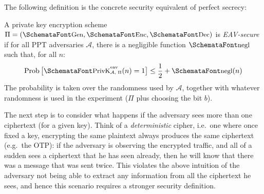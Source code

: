   The following definition is the concrete security equivalent of perfect secrecy:
  \begin{definition}
    \label{def:eav_secure}
    A private key encryption scheme $\Pi = (\myemph{Gen}, \myemph{Enc}, \myemph{Dec})$ is \emph{EAV-secure} if for all PPT adversaries $\mathcal{A}$, there is a negligible function $\myemph{negl}$ such that, for all $n$:
    \begin{equation}
      \textup{Prob}\left[\privkeav (n) = 1\right] \le \frac{1}{2} + \myemph{negl}(n)
    \end{equation}
    The probability is taken over the randomness used by $\mathcal{A}$, together with whatever randomness is used in the experiment ($\Pi$ plus choosing the bit $b$).
  \end{definition}

  \noindent The next step is to consider what happens if the adversary sees more than one ciphertext (for a given key). Think of a \emph{deterministic} cipher, i.e.\ one where once fixed a key, encrypting the same plaintext always produces the same ciphertext (e.g.\ the OTP): if the adversary is observing the encrypted traffic, and all of a sudden sees a ciphertext that he has seen already, then he will know that there was a message that was sent twice. This violates the above intuition of the adversary not being able to extract any information from all the ciphertext he sees, and hence this scenario requires a stronger security definition.

